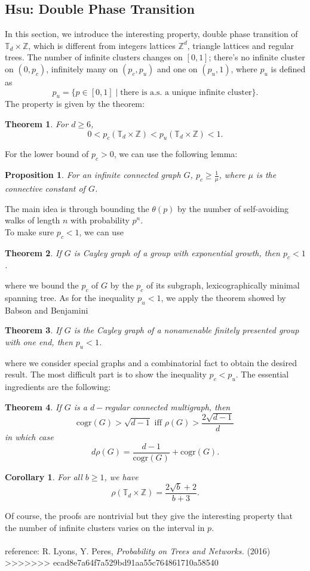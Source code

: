 \documentclass[12pt]{article}
\theoremstyle{plane}
\newtheorem*{thm}{Theorem}
\newtheorem*{cor}{Corollary}
\newtheorem*{prop}{Proposition}
\theoremstyle{definition}
\begin{document}
\subsection*{Hsu: Double Phase Transition}
In this section, we introduce the interesting property, double phase transition of $\mathbb{T}_d\times\mathbb{Z}$, which is different from integers lattices $\mathbb{Z}^d$, triangle lattices and regular trees. The number of infinite clusters changes on $[0,1]$; there's no infinite cluster on $(0,p_c)$, infinitely many on $(p_c,p_u)$ and one on $(p_u,1)$, where $p_u$ is defined as \[p_u=\{p\in [0,1] \mid \text{there is a.s. a unique infinite cluster}\}.\]
The property is given by the theorem:
\begin{thm}
For $d\geq 6$, \[0<p_c(\mathbb{T}_d\times\mathbb{Z})<p_u(\mathbb{T}_d\times\mathbb{Z})<1.\]
\end{thm}
For the lower bound of $p_c>0$, we can use the following lemma:
\begin{prop}
For an infinite connected graph $G$, $p_c\geq\frac{1}{\mu}$, where $\mu$ is the connective constant of $G$.
\end{prop}
The main idea is through bounding the $\theta(p)$ by the number of self-avoiding walks of length $n$ with probability $p^n$.\\To make sure $p_c<1$, 
we can use 
\begin{thm}
If $G$ is Cayley graph of a group with exponential growth, then $p_c<1$.
\end{thm}
where we bound the $p_c$ of $G$ by the $p_c$ of its subgraph, lexicographically minimal spanning tree. As for the inequality $p_u<1$, we apply the theorem showed by Babson and Benjamini
\begin{thm}
If $G$ is the Cayley graph of a nonamenable finitely presented group with one end, then $p_u<1$.
\end{thm}
where we consider special graphs and a combinatorial fact to obtain the desired result. The most difficult part is to show the inequality $p_c<p_u$. The essential ingredients are the following:
\begin{thm}
If $G$ is a $d-$regular connected multigraph, then \[\text{cogr}(G)>\sqrt{d-1} \text{ iff } \rho(G)>\frac{2\sqrt{d-1}}{d}\] in which case \[d\rho(G)=\frac{d-1}{\text{cogr}(G)}+\text{cogr}(G).\]
\end{thm}
\begin{cor}
For all $b\geq 1$, we have \[\rho(\mathbb{T}_d\times\mathbb{Z})=\frac{2\sqrt{b}+2}{b+3}.\]
\end{cor}
Of course, the proofs are nontrivial but they give the interesting property that the number of infinite clusters varies on the interval in $p$. \\
\bigskip\\
reference: R. Lyons, Y. Peres, \textit{Probability on Trees and Networks.} (2016)
>>>>>>> ecad8e7a64f7a529bd91aa55c764861710a58540
\end{document}
